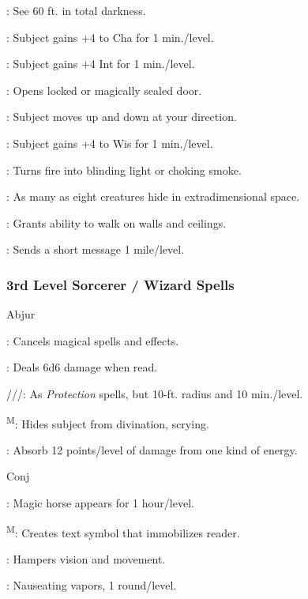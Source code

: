 : See 60 ft. in total darkness.

: Subject gains +4 to Cha for 1 min./level.

: Subject gains +4 Int for 1 min./level.

: Opens locked or magically sealed door.

: Subject moves up and down at your direction.

: Subject gains +4 to Wis for 1 min./level.

: Turns fire into blinding light or choking smoke.

: As many as eight creatures hide in extradimensional space.

: Grants ability to walk on walls and ceilings.

: Sends a short message 1 mile/level.

\subsubsection{3rd Level Sorcerer / Wizard Spells}

Abjur

: Cancels magical spells and effects.

: Deals 6d6 damage when read.

///: As \textit{Protection} spells, but 10-ft. radius and 10 min./level.

\textsuperscript{M}: Hides subject from divination, scrying.

: Absorb 12 points/level of damage from one kind of energy.

Conj

: Magic horse appears for 1 hour/level.

\textsuperscript{M}: Creates text symbol that immobilizes reader.

: Hampers vision and movement.

: Nauseating vapors, 1 round/level.

